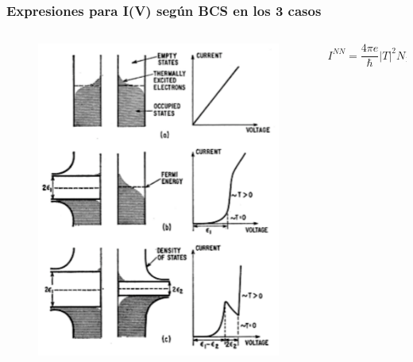 \begin{frame}
\frametitle{Expresiones para I(V) seg\'un BCS en los 3 casos}

\begin{columns}
\begin{column}{0.3\textwidth}
	\begin{figure}[!h] \label{fermi_levels}
	\includegraphics[width=\textwidth]{fermi_levels}
	\end{figure}
\end{column}
\begin{column}{0.7\textwidth}
\begin{flushleft}
	\begin{equation*}\label{inn}
		I^{NN} = \frac{4\pi e}{\hbar} |T|^2 N_1(\mu)N_2(\mu) eV
	\end{equation*}
	\begin{equation*}\label{cnn}

\end{equation*}
\end{flushleft}
\end{column}
\end{columns}
\end{frame}
